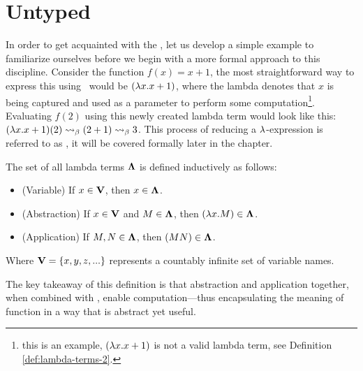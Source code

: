 \section{\centering Untyped \lCalc}
In order to get acquainted with the \lcalc, let us develop a simple example to familiarize ourselves before we begin with a more formal approach to this discipline. Consider the function $f(x) = x + 1$, the most straightforward way to express this using \lcalc \ would be $(\lambda x . x + 1 )$, where the lambda denotes that $x$ is being captured and used as a parameter to perform some computation\footnote{this is an example, $(\lambda x . x + 1 )$ is not a valid lambda term, see Definition \ref{def:lambda-terms-2}.}. Evaluating $f(2)$ using this newly created lambda term would look like this: $(\lambda x . x + 1)(2) \mathrel{\leadsto}_\beta (2 + 1) \mathrel{\leadsto}_\beta 3$. This process of reducing a $\lambda$-expression is referred to as \bred, it will be covered formally later in the chapter.

\begin{definition} The set of all lambda terms \( \mathbf{\Lambda} \) is defined inductively as follows:
  \label{def:lambda-terms-1}
  \begin{itemize}
  \item (Variable) If \( x \in \mathbf{V} \), then \( x \in \mathbf{\Lambda} \).  
  \item (Abstraction) If \( x \in \mathbf{V} \) and \( M \in \mathbf{\Lambda} \), then \( (\lambda x. M) \in \mathbf{\Lambda} \).
  \item (Application) If \( M, N \in \mathbf{\Lambda} \), then \((M N) \in \mathbf{\Lambda} \).
  \end{itemize}
  Where $\mathbf{V} = \{x, y, z, ... \}$ represents a countably infinite set of variable names.
\end{definition}
  
The key takeaway of this definition is that abstraction and application together, when combined with \bred, enable computation—thus encapsulating the meaning of function in a way that is abstract yet useful.

